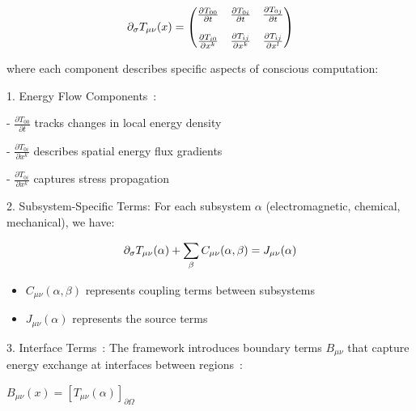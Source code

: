 \begin{equation}
    \partial_\sigma T_{\mu\nu}(x) = \begin{pmatrix}
        \frac{\partial T_{00}}{\partial t}   & \frac{\partial T_{0i}}{\partial t}   & \frac{\partial T_{0j}}{\partial t}   \\[1em]
        \frac{\partial T_{i0}}{\partial x^k} & \frac{\partial T_{ij}}{\partial x^k} & \frac{\partial T_{ij}}{\partial x^l}
    \end{pmatrix}
    \myequation{Matrix form of the stress-energy tensor Jacobian}
    \label{eq:matrix_jacobian}
\end{equation}

where each component describes specific aspects of conscious computation:

1. Energy Flow Components~:

- $\frac{\partial T_{00}}{\partial t}$ tracks changes in local energy density

- $\frac{\partial T_{0i}}{\partial x^k}$ describes spatial energy flux gradients

- $\frac{\partial T_{0i}}{\partial x^k}$ captures stress propagation

2. Subsystem-Specific Terms:
For each subsystem $\alpha$ (electromagnetic, chemical, mechanical), we have:

\begin{equation}
    \partial_\sigma T_{\mu\nu}(\alpha) + \sum_\beta C_{\mu\nu}(\alpha,\beta) = J_{\mu\nu}(\alpha)
    \myequation{Subsystem coupling equation with source terms}
    \label{eq:subsystem_coupling}
\end{equation}

\begin{itemize}
    \item $C_{\mu\nu}(\alpha,\beta)$ represents coupling terms between subsystems~
    \item $J_{\mu\nu}(\alpha)$ represents the source terms
\end{itemize}

3. Interface Terms~:
The framework introduces boundary terms $B_{\mu\nu}$ that capture energy exchange at interfaces between regions~:

$B_{\mu\nu}(x) = [T_{\mu\nu}(\alpha)]_{\partial\Omega}$

